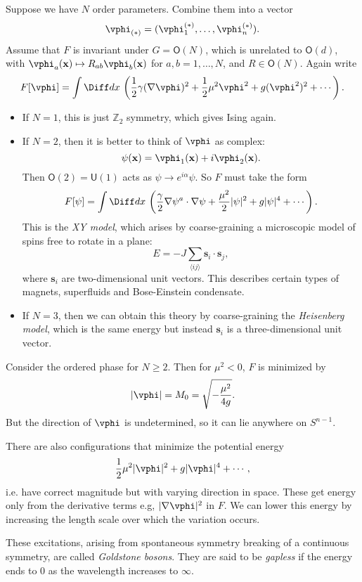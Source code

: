 \documentclass[12pt]{article}
\begin{document}
Suppose we have $N$ order parameters. Combine them into a vector
\[
\vphi_{(\ast)} = (\vphi_1^{(\ast)}, \ldots, \vphi_n^{(\ast)}).
\]
Assume that $F$ is invariant under $G = \mathsf{O}(N)$, which is unrelated to $\mathsf{O}(d)$, with $\vphi_a(\mathbf{x}) \mapsto R_{ab} \vphi_b(\mathbf{x})$ for $a, b = 1, \ldots, N$, and $R \in \mathsf{O}(N)$. Again write
\[
	F[\vphi] = \int \Diff d x \, \left( \frac 12 \gamma (\nabla \vphi)^2 + \frac 12 \mu^2 \vphi^2 + g(\vphi^2)^2 + \cdots\right).
\]
\begin{itemize}
	\item If $N = 1$, this is just $\mathbb{Z}_2$ symmetry, which gives Ising again.
	\item If $N = 2$, then it is better to think of $\vphi$ as complex:
		\[
		\psi(\mathbf{x}) = \vphi_1(\mathbf{x}) + i \vphi_2(\mathbf{x}).
		\]
		Then $\mathsf{O}(2) = \mathsf{U}(1)$ acts as $\psi \to e^{i \alpha} \psi$. So $F$ must take the form
		\[
			F[\psi] = \int \Diff d x\, \left( \frac \gamma 2 \nabla \psi^a \cdot \nabla \psi + \frac{\mu^2}2 |\psi|^2 + g|\psi|^{4} + \cdots \right).
		\]
		This is the \emph{XY model}, which arises by coarse-graining a microscopic model of spins free to rotate in a plane:
		\[
		E = - J \sum_{\langle i j \rangle} \mathbf{s}_i \cdot \mathbf{s}_j,
		\]
		where $\mathbf{s}_i$ are two-dimensional unit vectors. This describes certain types of magnets, superfluids and Bose-Einstein condensate.
	\item If $N = 3$, then we can obtain this theory by coarse-graining the \emph{Heisenberg model}, which is the same energy but instead $\mathbf{s}_i$ is a three-dimensional unit vector.
\end{itemize}

Consider the ordered phase for $N \geq 2$. Then for $\mu^2 < 0$, $F$ is minimized by
\[
|\vphi| = M_0 = \sqrt{-\frac{\mu^2}{4g}}.
\]
But the direction of $\vphi$ is undetermined, so it can lie anywhere on $S^{n-1}$.

There are also configurations that minimize the potential energy
\[
\frac{1}{2} \mu^2 |\vphi|^2 + g |\vphi|^4 + \cdots,
\]
i.e. have correct magnitude but with varying direction in space. These get energy only from the derivative terms e.g, $|\nabla \vphi|^2$ in $F$. We can lower this energy by increasing the length scale over which the variation occurs.

These excitations, arising from spontaneous symmetry breaking of a continuous symmetry, are called \emph{Goldstone bosons}. They are said to be \emph{gapless} if the energy ends to $0$ as the wavelength increases to $\infty$.
\end{document}
